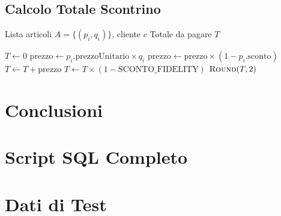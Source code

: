 \documentclass[12pt, a4paper, twoside, openright]{article}
\begin{document}
\subsection{Calcolo Totale Scontrino}

\begin{algorithm}[H]
\caption{Calcolo Totale Scontrino con Sconti}
\label{alg:scontrino}
\begin{algorithmic}[1]
\Require Lista articoli $A = \{(p_i, q_i)\}$, cliente $c$
\Ensure Totale da pagare $T$

\State $T \gets 0$
    \State $\text{prezzo} \gets p_i.\text{prezzoUnitario} \times q_i$
        \State $\text{prezzo} \gets \text{prezzo} \times (1 - p_i.\text{sconto})$
    \EndIf
    \State $T \gets T + \text{prezzo}$
\EndFor
{}
    \State $T \gets T \times (1 - \text{SCONTO\_FIDELITY})$
\EndIf
\State \Return $\Call{Round}{T, 2}$
\end{algorithmic}
\end{algorithm}

\newpage

\section*{Conclusioni}


\newpage

\appendix
\section{Script SQL Completo}


\section{Dati di Test}


\newpage


\end{document}
